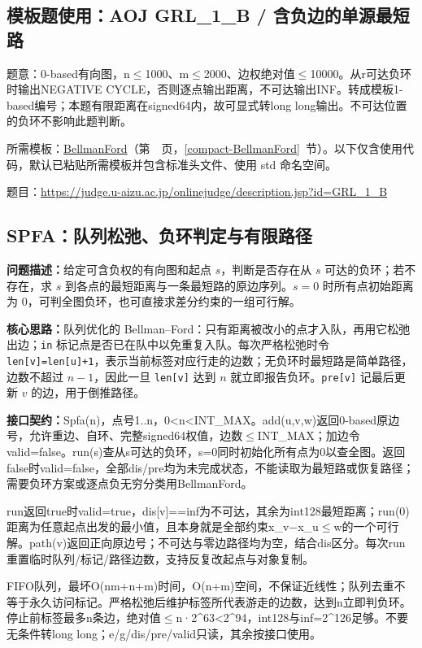 \Needspace{419pt}

\subsection*{模板题使用：AOJ GRL\_1\_B / 含负边的单源最短路}

\label{usage-example-293}

题意：0-based有向图，n$\le$1000、m$\le$2000、边权绝对值$\le$10000。从r可达负环时输出NEGATIVE CYCLE，否则逐点输出距离，不可达输出INF。转成模板1-based编号；本题有限距离在signed64内，故可显式转long long输出。不可达位置的负环不影响此题判断。

所需模板：\hyperref[compact-BellmanFord]{BellmanFord}（第~\pageref{compact-BellmanFord}~页，\ref{compact-BellmanFord}~节）。以下仅含使用代码，默认已粘贴所需模板并包含标准头文件、使用 std 命名空间。

题目：\url{https://judge.u-aizu.ac.jp/onlinejudge/description.jsp?id=GRL_1_B}



\subsection{SPFA：队列松弛、负环判定与有限路径}\label{compact-Spfa}

\noindent\textbf{问题描述：}\allowbreak 给定可含负权的有向图和起点 $s$，判断是否存在从 $s$ 可达的负环；若不存在，求 $s$ 到各点的最短距离与一条最短路的原边序列。$s=0$ 时所有点初始距离为 0，可判全图负环，也可直接求差分约束的一组可行解。

\textbf{核心思路：}\allowbreak 队列优化的 Bellman–Ford：只有距离被改小的点才入队，再用它松弛出边；\texttt{in} 标记点是否已在队中以免重复入队。每次严格松弛时令 \texttt{len[v]=len[u]+1}，表示当前标签对应行走的边数；无负环时最短路是简单路径，边数不超过 $n-1$，因此一旦 \texttt{len[v]} 达到 $n$ 就立即报告负环。\texttt{pre[v]} 记最后更新 $v$ 的边，用于倒推路径。



{\sloppy{}\noindent\textbf{接口契约：}Spfa(n)，点号1..n，0<n<INT\_MAX。add(u,v,w)返回0-based原边号，允许重边、自环、完整signed64权值，边数$\le$INT\_MAX；加边令valid=false。run(s)查从s可达的负环，s=0同时初始化所有点为0以查全图。返回false时valid=false，全部dis/pre均为未完成状态，不能读取为最短路或恢复路径；需要负环方案或逐点负无穷分类用BellmanFord。

run返回true时valid=true，dis[v]==inf为不可达，其余为int128最短距离；run(0)距离为任意起点出发的最小值，且本身就是全部约束x\_v−x\_u$\le$w的一个可行解。path(v)返回正向原边号；不可达与零边路径均为空，结合dis区分。每次run重置临时队列/标记/路径边数，支持反复改起点与对象复制。

FIFO队列，最坏O(nm+n+m)时间，O(n+m)空间，不保证近线性；队列去重不等于永久访问标记。严格松弛后维护标签所代表游走的边数，达到n立即判负环。停止前标签最多n条边，绝对值$\le$n·2\textasciicircum{}63<2\textasciicircum{}94，int128与inf=2\textasciicircum{}126足够。不要无条件转long long；e/g/dis/pre/valid只读，其余按接口使用。\par}

